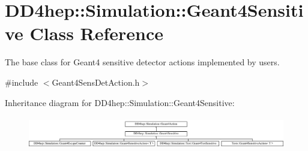 \hypertarget{class_d_d4hep_1_1_simulation_1_1_geant4_sensitive}{}\section{D\+D4hep\+:\+:Simulation\+:\+:Geant4\+Sensitive Class Reference}
\label{class_d_d4hep_1_1_simulation_1_1_geant4_sensitive}


The base class for Geant4 sensitive detector actions implemented by users.  




{\ttfamily \#include $<$Geant4\+Sens\+Det\+Action.\+h$>$}

Inheritance diagram for D\+D4hep\+:\+:Simulation\+:\+:Geant4\+Sensitive\+:\begin{figure}[H]
\begin{center}
\leavevmode
\includegraphics[height=1.433447cm]{class_d_d4hep_1_1_simulation_1_1_geant4_sensitive}
\end{center}
\end{figure}
